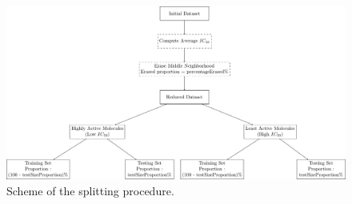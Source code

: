 \documentclass[12pt,letterpaper]{article}
\begin{document}
\begin{figure}[H]
\centering
\includegraphics[width = \textwidth]{GeneralSources/DataSplittingDiagram.pdf}
\caption{Scheme of the splitting procedure.}
\label{FigureDataSplittingDiagram}
\end{figure}
\end{document}
